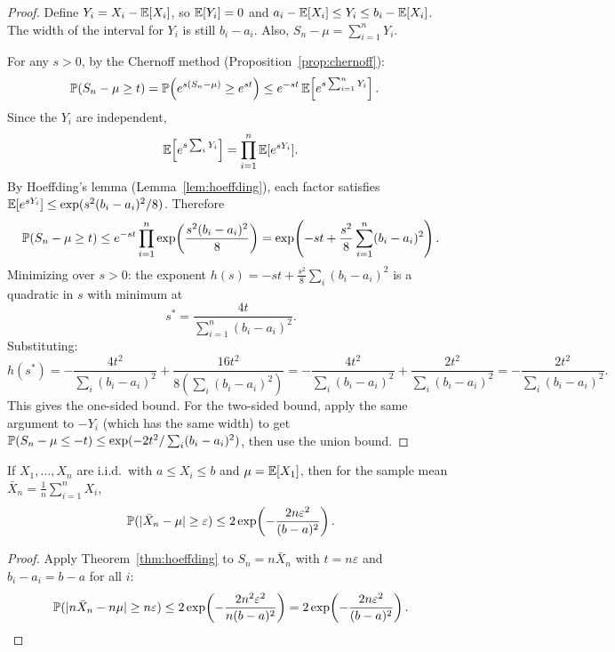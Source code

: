 \documentclass[11pt,a4paper]{article}
\begin{document}
\begin{proof}
Define $Y_i = X_i - \mathbb{E}[X_i]$, so $\mathbb{E}[Y_i] = 0$ and
$a_i - \mathbb{E}[X_i] \leq Y_i \leq b_i - \mathbb{E}[X_i]$. The width of the
interval for $Y_i$ is still $b_i - a_i$. Also,
$S_n - \mu = \sum_{i=1}^n Y_i$.

For any $s > 0$, by the Chernoff method
(Proposition~\ref{prop:chernoff}):
\begin{align*}
    \mathbb{P}(S_n - \mu \geq t)
    &= \mathbb{P}\!\left(e^{s(S_n - \mu)} \geq e^{st}\right)
    \leq e^{-st} \, \mathbb{E}\!\left[e^{s \sum_{i=1}^n Y_i}\right].
\end{align*}
Since the $Y_i$ are independent,
\[
    \mathbb{E}\!\left[e^{s \sum_i Y_i}\right]
    = \prod_{i=1}^n \mathbb{E}[e^{sY_i}].
\]
By Hoeffding's lemma (Lemma~\ref{lem:hoeffding}), each factor
satisfies $\mathbb{E}[e^{sY_i}] \leq \exp(s^2(b_i - a_i)^2/8)$.
Therefore
\[
    \mathbb{P}(S_n - \mu \geq t)
    \leq e^{-st} \prod_{i=1}^n \exp\!\left(\frac{s^2(b_i-a_i)^2}{8}\right)
    = \exp\!\left(-st + \frac{s^2}{8}\sum_{i=1}^n (b_i-a_i)^2\right).
\]
Minimizing over $s > 0$: the exponent
$h(s) = -st + \frac{s^2}{8}\sum_i (b_i - a_i)^2$ is a quadratic in
$s$ with minimum at
\[
    s^* = \frac{4t}{\sum_{i=1}^n (b_i - a_i)^2}.
\]
Substituting:
\[
    h(s^*) = -\frac{4t^2}{\sum_i(b_i-a_i)^2}
    + \frac{16t^2}{8(\sum_i(b_i-a_i)^2)}
    = -\frac{4t^2}{\sum_i(b_i-a_i)^2}
    + \frac{2t^2}{\sum_i(b_i-a_i)^2}
    = -\frac{2t^2}{\sum_i(b_i-a_i)^2}.
\]
This gives the one-sided bound. For the two-sided bound, apply the
same argument to $-Y_i$ (which has the same width) to get
$\mathbb{P}(S_n - \mu \leq -t) \leq
\exp(-2t^2/\sum_i(b_i-a_i)^2)$,
then use the union bound.
\end{proof}

\begin{corollary}
\label{cor:hoeffding_iid}
If $X_1, \ldots, X_n$ are i.i.d.\ with $a \leq X_i \leq b$ and
$\mu = \mathbb{E}[X_1]$, then for the sample mean
$\bar{X}_n = \frac{1}{n}\sum_{i=1}^n X_i$,
\[
    \mathbb{P}(|\bar{X}_n - \mu| \geq \varepsilon)
    \leq 2\exp\!\left(-\frac{2n\varepsilon^2}{(b-a)^2}\right).
\]
\end{corollary}

\begin{proof}
Apply Theorem~\ref{thm:hoeffding} to $S_n = n\bar{X}_n$ with
$t = n\varepsilon$ and $b_i - a_i = b - a$ for all $i$:
\[
    \mathbb{P}(|n\bar{X}_n - n\mu| \geq n\varepsilon)
    \leq 2\exp\!\left(-\frac{2n^2\varepsilon^2}{n(b-a)^2}\right)
    = 2\exp\!\left(-\frac{2n\varepsilon^2}{(b-a)^2}\right). \qedhere
\]
\end{proof}
\end{document}
